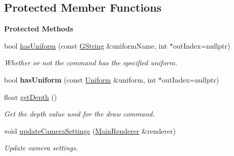 \subsection*{Protected Member Functions}
\begin{Indent}\textbf{ Protected Methods}\par
\begin{DoxyCompactItemize}
\item 
\mbox{\label{classrev_1_1_draw_command_a2f9ac2672eae1c8f4bf4ce217c6d7f54}} 
bool \mbox{\hyperlink{classrev_1_1_draw_command_a2f9ac2672eae1c8f4bf4ce217c6d7f54}{has\+Uniform}} (const \mbox{\hyperlink{classrev_1_1_g_string}{G\+String}} \&uniform\+Name, int $\ast$out\+Index=nullptr)
\begin{DoxyCompactList}\small\item\em Whether or not the command has the specified uniform. \end{DoxyCompactList}\item 
\mbox{\label{classrev_1_1_draw_command_ae67e095fd28c55c207fa32ca1cd06020}} 
bool {\bfseries has\+Uniform} (const \mbox{\hyperlink{structrev_1_1_uniform}{Uniform}} \&uniform, int $\ast$out\+Index=nullptr)
\item 
\mbox{\label{classrev_1_1_draw_command_a8e6ba8d8c05395eac362fafd74aef773}} 
float \mbox{\hyperlink{classrev_1_1_draw_command_a8e6ba8d8c05395eac362fafd74aef773}{get\+Depth}} ()
\begin{DoxyCompactList}\small\item\em Get the depth value used for the draw command. \end{DoxyCompactList}\item 
\mbox{\label{classrev_1_1_draw_command_a55e1dfff0acfa16c54b2907a2b672372}} 
void \mbox{\hyperlink{classrev_1_1_draw_command_a55e1dfff0acfa16c54b2907a2b672372}{update\+Camera\+Settings}} (\mbox{\hyperlink{classrev_1_1_main_renderer}{Main\+Renderer}} \&renderer)
\begin{DoxyCompactList}\small\item\em Update camera settings. \end{DoxyCompactList}\item 
\mbox{\label{classrev_1_1_draw_command_af9c1172b54caff340fa75b18317fcb80}} 

\end{DoxyCompactItemize}
\end{Indent}

